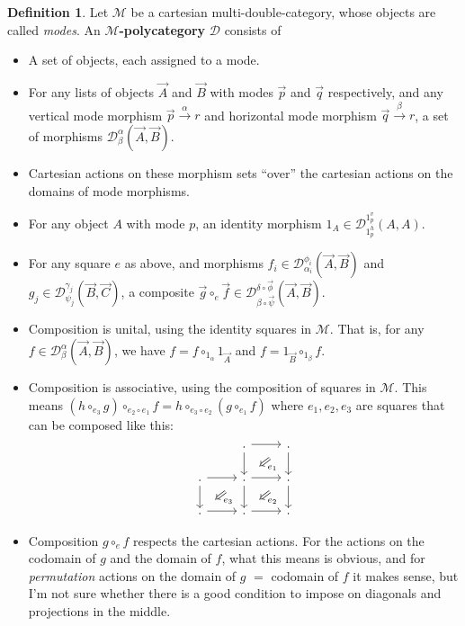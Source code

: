 \documentclass{article}
\theoremstyle{definition}
\newtheorem{defn}{Definition}
\def\M{\mathcal{M}}
\def\D{\mathcal{D}}
\def\DD#1#2{\mathcal{D}^{#1}_{#2}}
\let\xto\xrightarrow
\begin{document}
\begin{defn}
  Let $\M$ be a cartesian multi-double-category, whose objects are called \emph{modes}.
  An \textbf{$\M$-polycategory} $\D$ consists of
  \begin{itemize}
  \item A set of objects, each assigned to a mode.
  \item For any lists of objects $\vec{A}$ and $\vec{B}$ with modes $\vec{p}$ and $\vec{q}$ respectively, and any vertical mode morphism $\vec{p} \xto{\alpha} r$ and horizontal mode morphism $\vec{q} \xto{\beta} r$, a set of morphisms $\DD\alpha\beta(\vec{A},\vec{B})$.
  \item Cartesian actions on these morphism sets ``over'' the cartesian actions on the domains of mode morphisms.
  \item For any object $A$ with mode $p$, an identity morphism $1_A \in \DD{1_p^v}{1_p^h}(A,A)$.
  \item For any square $e$ as above, and morphisms $f_i \in \DD{\phi_i}{\alpha_i}(\vec{A},\vec{B})$ and $g_j \in \DD{\gamma_j}{\psi_j}(\vec{B},\vec{C})$, a composite $\vec{g} \circ_e \vec{f} \in \DD{\delta\circ \vec{\phi}}{\beta\circ\vec{\psi}}(\vec{A},\vec{B})$.
  \item Composition is unital, using the identity squares in $\M$.
    That is, for any $f\in\DD{\alpha}{\beta}(\vec{A},\vec{B})$, we have $f = f \circ_{1_\alpha} 1_{\vec{A}}$ and $f = 1_{\vec{B}} \circ_{1_\beta} f$.
  \item Composition is associative, using the composition of squares in $\M$.
    This means $(h\circ_{e_3}g)\circ_{e_2 \circ e_1} f = h\circ_{e_3\circ e_2} (g\circ_{e_1} f)$ where $e_1,e_2,e_3$ are squares that can be composed like this:
    \[\begin{tikzcd}
       & . \ar[r] \ar[d]
      \ar[from=r,to=d,phantom,""{name=1,near start},""{name=2,near end}]
      \ar[Rightarrow,from=1,to=2,"e_1"]
      & .\ar[d] \\
      .\ar[r] \ar[d]
      \ar[from=r,to=d,phantom,""{name=3,near start},""{name=4,near end}]
      \ar[Rightarrow,from=3,to=4,"e_3"]
      & .\ar[r] \ar[d]
      \ar[from=r,to=d,phantom,""{name=5,near start},""{name=6,near end}]
      \ar[Rightarrow,from=5,to=6,"e_2"]
      & .\ar[d] \\
      .\ar[r] & .\ar[r] & .
    \end{tikzcd}\]
  \item Composition $g\circ_e f$ respects the cartesian actions.
    For the actions on the codomain of $g$ and the domain of $f$, what this means is obvious, and for \emph{permutation} actions on the domain of $g$ $=$ codomain of $f$ it makes sense, but I'm not sure whether there is a good condition to impose on diagonals and projections in the middle.
  \end{itemize}
\end{defn}
\end{document}
